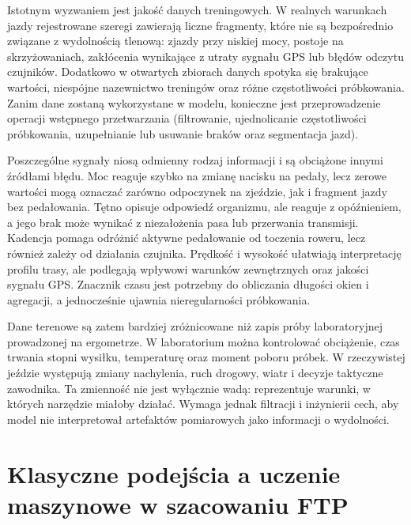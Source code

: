 Istotnym wyzwaniem jest jakość danych treningowych.
W realnych warunkach jazdy rejestrowane szeregi zawierają liczne fragmenty, które nie są bezpośrednio związane z wydolnością tlenową: zjazdy przy niskiej mocy, postoje na skrzyżowaniach, zakłócenia wynikające z utraty sygnału GPS lub błędów odczytu czujników.
Dodatkowo w otwartych zbiorach danych spotyka się brakujące wartości, niespójne nazewnictwo treningów oraz różne częstotliwości próbkowania.
Zanim dane zostaną wykorzystane w modelu, konieczne jest przeprowadzenie operacji wstępnego przetwarzania (filtrowanie, ujednolicanie częstotliwości próbkowania, uzupełnianie lub usuwanie braków oraz segmentacja jazd).

Poszczególne sygnały niosą odmienny rodzaj informacji i są obciążone innymi źródłami błędu. Moc reaguje szybko na zmianę nacisku na pedały, lecz zerowe wartości mogą oznaczać zarówno odpoczynek na zjeździe, jak i fragment jazdy bez pedałowania. Tętno opisuje odpowiedź organizmu, ale reaguje z opóźnieniem, a jego brak może wynikać z niezałożenia pasa lub przerwania transmisji. Kadencja pomaga odróżnić aktywne pedałowanie od toczenia roweru, lecz również zależy od działania czujnika. Prędkość i wysokość ułatwiają interpretację profilu trasy, ale podlegają wpływowi warunków zewnętrznych oraz jakości sygnału GPS. Znacznik czasu jest potrzebny do obliczania długości okien i agregacji, a jednocześnie ujawnia nieregularności próbkowania.

Dane terenowe są zatem bardziej zróżnicowane niż zapis próby laboratoryjnej prowadzonej na ergometrze. W laboratorium można kontrolować obciążenie, czas trwania stopni wysiłku, temperaturę oraz moment poboru próbek. W rzeczywistej jeździe występują zmiany nachylenia, ruch drogowy, wiatr i decyzje taktyczne zawodnika. Ta zmienność nie jest wyłącznie wadą: reprezentuje warunki, w których narzędzie miałoby działać. Wymaga jednak filtracji i inżynierii cech, aby model nie interpretował artefaktów pomiarowych jako informacji o wydolności.

\section{Klasyczne podejścia a uczenie maszynowe w szacowaniu FTP}


